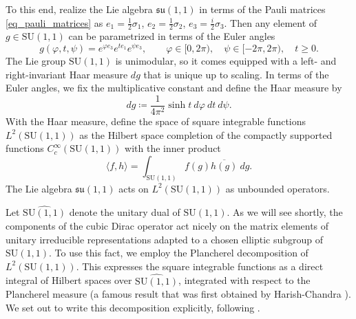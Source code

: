 \documentclass{amsart}
\theoremstyle{definition}
\theoremstyle{remark}
\numberwithin{equation}{section}
\begin{document}
To this end, realize the Lie algebra $\mathfrak{su}(1,1)$ in terms of the Pauli matrices \eqref{eq_pauli_matrices} as $e_1=\tfrac{1}{2}\sigma_1$, $e_2=\tfrac{1}{2}\sigma_2$, $e_3=\tfrac{i}{2}\sigma_3$. Then any element of $g\in\mathrm{SU}(1,1)$ can be parametrized in terms of the Euler angles 
\begin{equation}\label{eq_parametrization_SU(1,1)}
    g(\varphi,t,\psi)=e^{\varphi e_3}e^{te_1}e^{\psi e_3},\qquad \varphi\in[0,2\pi),\quad \psi\in [-2\pi,2\pi),\quad t\geq 0.
\end{equation}
The Lie group $\mathrm{SU}(1,1)$ is unimodular, so it comes equipped with a left- and right-invariant Haar measure $dg$ that is unique up to scaling. In terms of the Euler angles, we fix the multiplicative constant and define the Haar measure by
\begin{equation}\label{eq_haar_measure}
    dg\coloneq\frac{1}{4\pi^2}\sinh t \ d\varphi \ dt \ d\psi.
\end{equation} 
With the Haar measure, define the space of square integrable functions $L^2(\mathrm{SU}(1,1))$ as the Hilbert space completion of the compactly supported functions $C^\infty_c(\mathrm{SU}(1,1))$ with the inner product
\begin{equation*}
    \langle f,h\rangle=\int_{\mathrm{SU}(1,1)}f(g)\overline{h(g)}\ dg.
\end{equation*}
The Lie algebra $\mathfrak{su}(1,1)$ acts on $L^2(\mathrm{SU}(1,1))$ as unbounded operators.

Let $\widehat{\mathrm{SU}(1,1)}$ denote the unitary dual of $\mathrm{SU}(1,1)$. As we will see shortly, the components of the cubic Dirac operator act nicely on the matrix elements of unitary irreducible representations adapted to a chosen elliptic subgroup of $\mathrm{SU}(1,1)$. To use this fact, we employ the Plancherel decomposition of $L^2(\mathrm{SU}(1,1))$. This expresses the square integrable functions as a direct integral of Hilbert spaces over $\widehat{\mathrm{SU}(1,1)}$, integrated with respect to the Plancherel measure (a famous result that was first obtained by Harish-Chandra \cite{harish-chandra_1952}). We set out to write this decomposition explicitly, following \cite{vilenkin_klimyk_1991}. 
\end{document}
